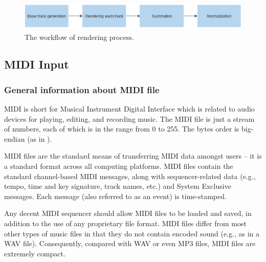 \documentclass[runningheads]{llncs}
\begin{document}
\begin{figure}[!htb]
	\includegraphics[width=1\textwidth,height=1.4cm]{renderingWorkflow.png}
	\caption{The workflow of rendering process.}
	\label{fig:renderworkflow}
\end{figure}

\subsection{MIDI Input}\label{sec:midi}
\subsubsection{General information about MIDI file} 

MIDI is short for Musical Instrument Digital Interface which is related to audio devices for playing, editing, and recording music. The MIDI file is just a stream of numbers, each of which is in the range from 0 to 255. The bytes order is big-endian\label{gloss:endianness}\label{gloss:big-endian} (as in \cite{midispec}).

MIDI files are the standard means of transferring MIDI data amongst users – it is a standard format across all computing platforms. MIDI files contain the standard channel-based MIDI messages, along with sequencer-related data (e.g., tempo, time and key signature, track names, etc.) and System Exclusive messages. Each message (also referred to as an event) is time-stamped.


Any decent MIDI sequencer should allow MIDI files to be loaded and saved, in addition to the use of any proprietary file format. MIDI files differ from most other types of music files in that they do not contain encoded sound (e.g., as in a WAV file). Consequently, compared with WAV or even MP3 files, MIDI files are extremely compact.
\end{document}
